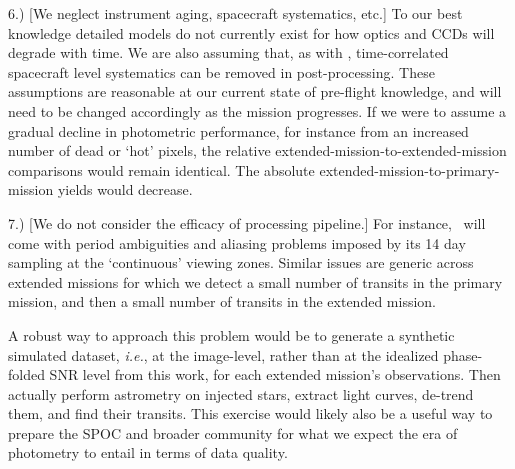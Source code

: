 \begin{description}
	
	\item 6.) [We neglect instrument aging, spacecraft systematics, etc.]
	To our best knowledge detailed models do not currently exist for how \tesss optics and CCDs will degrade with time.
	We are also assuming that, as with \ktwo, time-correlated spacecraft level systematics can be removed in post-processing.
	These assumptions are reasonable at our current state of pre-flight knowledge, and will need to be changed accordingly as the mission progresses.
	If we were to assume a gradual decline in photometric performance, for instance from an increased number of dead or `hot' pixels, the relative extended-mission-to-extended-mission comparisons would remain identical.
	The absolute extended-mission-to-primary-mission yields would decrease.
	
	\item 7.) [We do not consider the efficacy of processing pipeline.]
	For instance, \hemis\ will come with period ambiguities and aliasing problems imposed by its 14 day sampling at the `continuous' viewing zones.
	Similar issues are generic across extended missions for which we detect a small number of transits in the primary mission, and then a small number of transits in the extended mission.
	
	A robust way to approach this problem would be to generate a synthetic simulated \tess dataset, \textit{i.e.}, at the image-level, rather than at the idealized phase-folded SNR level from this work, for each extended mission's observations.
	Then actually perform astrometry on injected stars, extract light curves, de-trend them, and find their transits.
	This exercise would likely also be a useful way to prepare the SPOC and broader community for what we expect the era of \tess photometry to entail in terms of data quality.	
\end{description}


